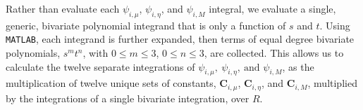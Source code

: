 \documentclass{mc2015}
\newcommand{\benum}{\begin{equation}} 			%
\newcommand{\eenum}{\end{equation}}
\newcommand{\beanum}{\begin{eqnarray}}  %
\newcommand{\eeanum}{\end{eqnarray}}
\newcommand{\eqts}[1]{Eqs. (\ref{#1})}  %
\newcommand{\B}[1]{\ensuremath{{B_{#1} }}}
\newcommand{\p}{\ensuremath{ \partial}}
\newcommand{\abs}[1]{\ensuremath{\left\lvert #1 \right\rvert}}
\newcommand{\BCSZ}{\ensuremath{\widetilde{\psi}_{BCSZ}}}
\newcommand{\BCSZH}{\ensuremath{\widehat{\psi}_{BCSZ}}}
\newcommand{\pec}{\, ,}
\newcommand{\pep}{\, .}
\begin{document}
Rather than evaluate each $\psi_{i,\mu}$, $\psi_{i,\eta}$, and $\psi_{i,M}$ integral, we evaluate a single, generic, bivariate polynomial integrand that is only a function of $s$ and $t$.
Using \verb+MATLAB+\cite{matlab},  each integrand is further expanded, then terms of equal degree bivariate polynomials,  $s^m t^n$,  with $0 \leq m \leq 3$, $0 \leq n \leq 3$, are collected.
This allows us to calculate the twelve separate integrations of  $\psi_{i,\mu},~\psi_{i,\eta},~\text{and }\psi_{i,M}$, as the multiplication of twelve unique sets of constants, $\mathbf{C}_{i,\mu}$, $\mathbf{C}_{i,\eta}$, and $\mathbf{C}_{i,M}$, multiplied  by the integrations of a single bivariate  integration, over $R$.
\end{document}
